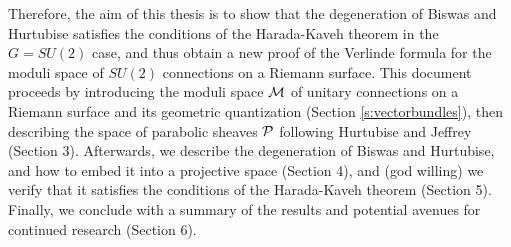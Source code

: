 	Therefore, the aim of this thesis is to show that the degeneration of Biswas and Hurtubise satisfies the conditions of the Harada-Kaveh theorem in the $G=SU(2)$ case, and thus obtain a new proof of the Verlinde formula for the moduli space of $SU(2)$ connections on a Riemann surface. This document proceeds by introducing the moduli space $\mathcal{M}$ of unitary connections on a Riemann surface and its geometric quantization (Section \ref{s:vectorbundles}), then describing the space of parabolic sheaves $\mathcal{P}$ following Hurtubise and Jeffrey (Section 3). Afterwards, we describe the degeneration of Biswas and Hurtubise, and how to embed it into a projective space (Section 4), and (god willing) we verify that it satisfies the conditions of the Harada-Kaveh theorem (Section 5). Finally, we conclude with a summary of the results and potential avenues for continued research (Section 6).

